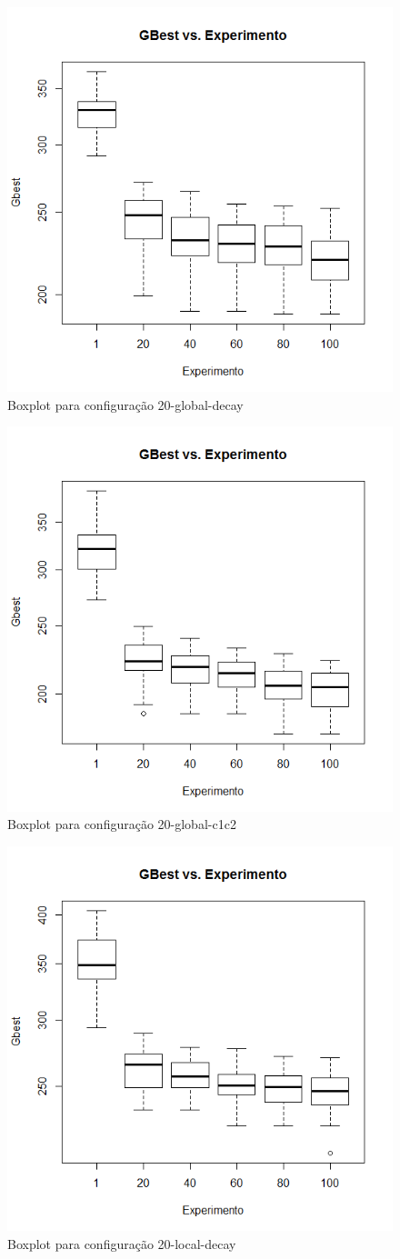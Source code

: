 \begin{figure}[H]
	\centering
	\includegraphics[width=.6\textwidth]{img/result_20_global_decay.png}
	\caption{Boxplot para configura\c{c}\~ao 20-global-decay}
	\label{fig:result_20_global_decay}
\end{figure}

\begin{figure}[H]
	\centering
	\includegraphics[width=.6\textwidth]{img/result_20_global_c1c2.png}
	\caption{Boxplot para configura\c{c}\~ao 20-global-c1c2}
	\label{fig:result_20_global_c1c2}
\end{figure}

\begin{figure}[H]
	\centering
	\includegraphics[width=.6\textwidth]{img/result_20_local_decay.png}
	\caption{Boxplot para configura\c{c}\~ao 20-local-decay}
	\label{fig:result_20_local_decay}
\end{figure}

